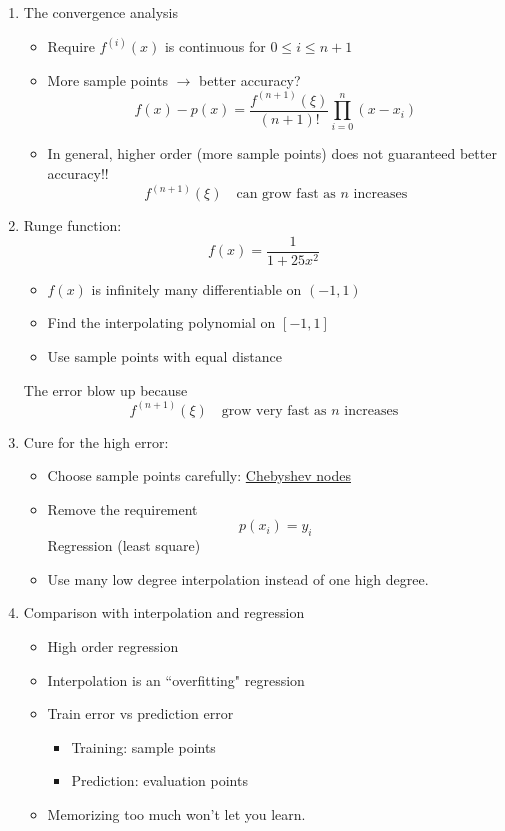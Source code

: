 \documentclass{article}
\newtheorem{thm}{Theorem}[section]
\theoremstyle{remark}
\begin{document}
\begin{enumerate}
\begin{enumerate}
\item \begin{thm}[Rolle's theorem]
If $f(x)$ is continuously differentiable on $(a,b)$ and $f(a) = f(b) = 0$, then there's a $\xi$ in $(a,b)$ such that 
$$
f'(\xi) = 0
$$
\end{thm}
\end{enumerate}

\item The convergence analysis
\begin{itemize}
\item Require $f^{(i)}(x)$ is continuous for $0\leq i\leq n+1$
\item More sample points $\rightarrow$ better accuracy?
$$
f(x) - p(x) = \frac{f^{(n+1)}(\xi)}{(n+1)!}\prod_{i=0}^n (x-x_i)
$$
\item In general, higher order (more sample points) {\color{red} does not} guaranteed better accuracy!!
$$
f^{(n+1)}(\xi)\quad  \text{can grow fast as $n$ increases}
$$
\end{itemize}

\item Runge function: 
$$
f(x)  = \frac{1}{1+25x^2}
$$
\begin{itemize}
\item $f(x)$ is infinitely many differentiable on $(-1,1)$
\item Find the interpolating polynomial on $[-1,1]$
\item Use sample points with equal distance
\end{itemize}
The error blow up because
$$
f^{(n+1)}(\xi)\quad  \text{grow very fast as $n$ increases}
$$

\item Cure for the high error:
\begin{itemize}
\item Choose sample points carefully: \href{https://en.wikipedia.org/wiki/Chebyshev_nodes}{{\color{red}Chebyshev nodes}}
\item Remove the requirement 
$$
p(x_i) = y_i
$$
Regression (least square)
\item Use many low degree interpolation instead of one high degree.
\end{itemize}

\item Comparison with interpolation and regression
\begin{itemize}
\item High order regression
\item Interpolation is an ``overfitting" regression
\item Train error vs prediction error
\begin{itemize}
\item Training: sample points
\item Prediction: evaluation points
\end{itemize}
\item Memorizing too much won't let you learn.
\end{itemize}


\end{enumerate}
\end{document}
